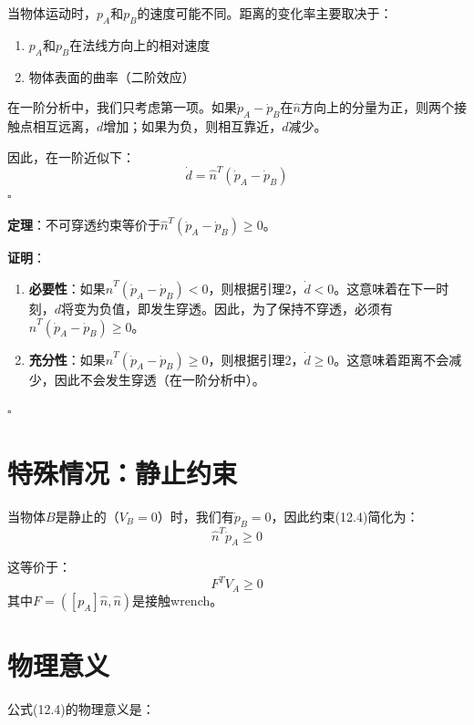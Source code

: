 \documentclass[12pt,a4paper]{article}
\begin{document}
当物体运动时，$p_A$和$p_B$的速度可能不同。距离的变化率主要取决于：
\begin{enumerate}
\item $p_A$和$p_B$在法线方向上的相对速度
\item 物体表面的曲率（二阶效应）
\end{enumerate}

在一阶分析中，我们只考虑第一项。如果$\dot{p}_A - \dot{p}_B$在$\hat{n}$方向上的分量为正，则两个接触点相互远离，$d$增加；如果为负，则相互靠近，$d$减少。

因此，在一阶近似下：
\begin{equation}
\dot{d} = \hat{n}^T (\dot{p}_A - \dot{p}_B)
\end{equation}
$\square$

\textbf{定理}：不可穿透约束等价于$\hat{n}^T (\dot{p}_A - \dot{p}_B) \geq 0$。

\textbf{证明}：
\begin{enumerate}
\item \textbf{必要性}：如果$\hat{n}^T (\dot{p}_A - \dot{p}_B) < 0$，则根据引理2，$\dot{d} < 0$。这意味着在下一时刻，$d$将变为负值，即发生穿透。因此，为了保持不穿透，必须有$\hat{n}^T (\dot{p}_A - \dot{p}_B) \geq 0$。

\item \textbf{充分性}：如果$\hat{n}^T (\dot{p}_A - \dot{p}_B) \geq 0$，则根据引理2，$\dot{d} \geq 0$。这意味着距离不会减少，因此不会发生穿透（在一阶分析中）。
\end{enumerate}
$\square$

\section{特殊情况：静止约束}

当物体$B$是静止的（$V_B = 0$）时，我们有$\dot{p}_B = 0$，因此约束(12.4)简化为：
\begin{equation}
\hat{n}^T \dot{p}_A \geq 0
\label{eq:12.7}
\end{equation}

这等价于：
\begin{equation}
F^T V_A \geq 0
\end{equation}
其中$F = ([p_A]\hat{n}, \hat{n})$是接触wrench。

\section{物理意义}

公式(12.4)的物理意义是：
\end{document}
